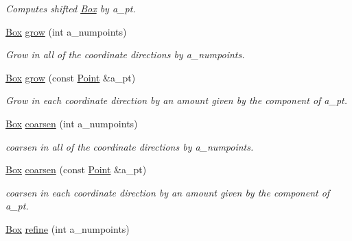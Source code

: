 \begin{DoxyCompactItemize}
\begin{DoxyCompactList}\small\item\em Computes shifted \hyperlink{classBox}{Box} by a\+\_\+pt. \end{DoxyCompactList}\item 
\hypertarget{classBox_ae55bf559ec09e3968c69210e224789ce}{}\hyperlink{classBox}{Box} \hyperlink{classBox_ae55bf559ec09e3968c69210e224789ce}{grow} (int a\+\_\+numpoints)\label{classBox_ae55bf559ec09e3968c69210e224789ce}

\begin{DoxyCompactList}\small\item\em Grow in all of the coordinate directions by a\+\_\+numpoints. \end{DoxyCompactList}\item 
\hypertarget{classBox_a5e36dea04f5a69f195408a6d0e0592ba}{}\hyperlink{classBox}{Box} \hyperlink{classBox_a5e36dea04f5a69f195408a6d0e0592ba}{grow} (const \hyperlink{classPoint}{Point} \&a\+\_\+pt)\label{classBox_a5e36dea04f5a69f195408a6d0e0592ba}

\begin{DoxyCompactList}\small\item\em Grow in each coordinate direction by an amount given by the component of a\+\_\+pt. \end{DoxyCompactList}\item 
\hypertarget{classBox_acdae3f12a6523dfff88b3cc421b3f675}{}\hyperlink{classBox}{Box} \hyperlink{classBox_acdae3f12a6523dfff88b3cc421b3f675}{coarsen} (int a\+\_\+numpoints)\label{classBox_acdae3f12a6523dfff88b3cc421b3f675}

\begin{DoxyCompactList}\small\item\em coarsen in all of the coordinate directions by a\+\_\+numpoints. \end{DoxyCompactList}\item 
\hypertarget{classBox_ab8edbeddfbefdaccb8f69894cea8d920}{}\hyperlink{classBox}{Box} \hyperlink{classBox_ab8edbeddfbefdaccb8f69894cea8d920}{coarsen} (const \hyperlink{classPoint}{Point} \&a\+\_\+pt)\label{classBox_ab8edbeddfbefdaccb8f69894cea8d920}

\begin{DoxyCompactList}\small\item\em coarsen in each coordinate direction by an amount given by the component of a\+\_\+pt. \end{DoxyCompactList}\item 
\hypertarget{classBox_a0062584dbed1587ad9a8d15425f55055}{}\hyperlink{classBox}{Box} \hyperlink{classBox_a0062584dbed1587ad9a8d15425f55055}{refine} (int a\+\_\+numpoints)\label{classBox_a0062584dbed1587ad9a8d15425f55055}


\end{DoxyCompactItemize}
